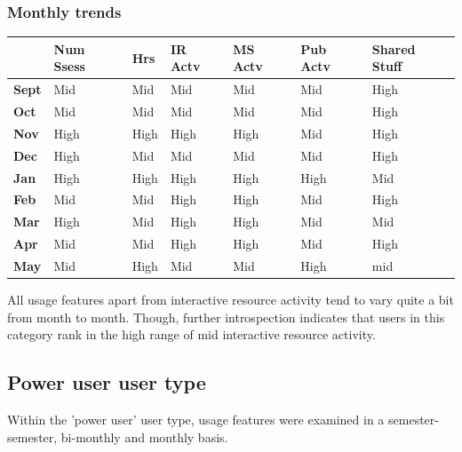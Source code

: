\documentclass{acm_proc_article-sp}
\begin{document}
\subsubsection{Monthly trends}
\begin{table}
\label{cluster2bimonthly}
\begin{tabular}{|p{1.5cm}|p{0.6cm}|p{0.6cm}|p{0.6cm}|p{0.6cm}|p{0.8cm}|p{0.8cm}|}
 & Num Ssess & Hrs & IR Actv & MS Actv & Pub Actv & Shared Stuff \\ \hline
\textbf{Sept} & Mid                                    & Mid   & Mid         & Mid             & Mid            & High                \\
\textbf{Oct}   & Mid                                    & Mid   & Mid         & Mid             & Mid            & High                \\
\textbf{Nov}  & High                                   & High  & High        & High            & Mid            & High                \\
\textbf{Dec}  & High                                   & Mid   & Mid         & Mid             & Mid            & High                \\
\textbf{Jan}   & High                                   & High  & High        & High            & High           & Mid                 \\
\textbf{Feb}  & Mid                                    & Mid   & High        & High            & Mid            & High                \\
\textbf{Mar}     & High                                   & Mid   & High        & High            & Mid            & Mid                 \\
\textbf{Apr}     & Mid                                    & Mid   & High        & High            & Mid            & High                \\
\textbf{May}       & Mid                                    & High  & Mid         & Mid             & High           & mid                
\end{tabular}
\end{table}
All usage features apart from interactive resource activity tend to vary quite a bit from month to month. Though, further introspection indicates that users in this category rank in the high range of mid interactive resource activity.

\subsection {Power user user type}
Within the 'power user' user type, usage features were examined in a semester-semester, bi-monthly and monthly basis.
\end{document}
